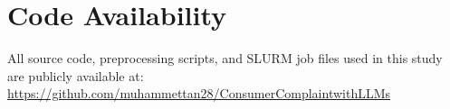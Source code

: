 \documentclass[a4paper,fleqn]{cas-dc}
\begin{document}
\section*{Code Availability}
All source code, preprocessing scripts, and SLURM job files used in
this study are publicly available at:
\url{https://github.com/muhammettan28/ConsumerComplaintwithLLMs}

\printcredits

\FloatBarrier



\end{document}
